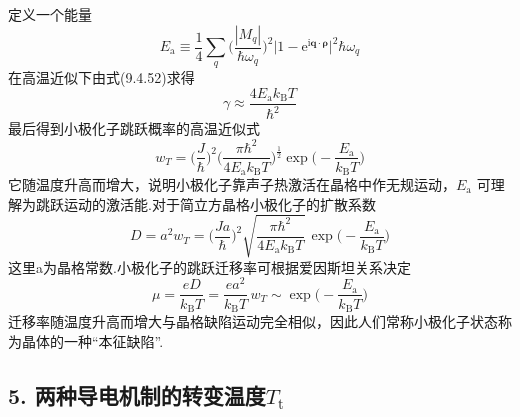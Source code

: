 定义一个能量
\begin{equation}
  E_{\mathrm a}\equiv\frac{1}{4}\sum_{q}
  \biggl(\frac{|M_{q}|}{\hbar\omega_{q}}\biggr)^{2}
  \bigl|1-\mathrm{e}^{\mathrm{i}\boldsymbol{q}\cdot\boldsymbol{\rho}}\bigr|^{2}
  \hbar\omega_{q}
\end{equation}
在高温近似下由式(9.4.52)求得
\begin{equation}
  \gamma\approx\frac{4E_{\mathrm a}k_{\mathrm B}T}{\hbar^{2}}
\end{equation}
最后得到小极化子跳跃概率的高温近似式
\begin{equation}
  w_{T}=\biggl(\frac{J}{\hbar}\biggr)^{2}
  \biggl(\frac{\pi\hbar^{2}}{4E_{\mathrm a}k_{\mathrm B}T}\biggr)^{\frac{1}{2}}
  \exp\biggl(-\frac{E_{\mathrm a}}{k_{\mathrm B}T}\biggr)
\end{equation}
它随温度升高而增大，说明小极化子靠声子热激活在晶格中作无规运动，$E_{\mathrm a}$ 可理解为跳跃运动的激活能.对于简立方晶格小极化子的扩散系数
\begin{equation}
  D=a^{2}w_{T}=\biggl(\frac{Ja}{\hbar}\biggr)^{2}
  \sqrt{\frac{\pi\hbar^{2}}{4E_{\mathrm a}k_{\mathrm B}T}}\,
  \exp\biggl(-\frac{E_{\mathrm a}}{k_{\mathrm B}T}\biggr)
\end{equation}
这里a为晶格常数.小极化子的跳跃迁移率可根据爱因斯坦关系决定
\begin{equation}
  \mu=\frac{eD}{k_{\mathrm B}T}
  =\frac{ea^{2}}{k_{\mathrm B}T}\,w_{T}
  \sim\exp\biggl(-\frac{E_{\mathrm a}}{k_{\mathrm B}T}\biggr)
\end{equation}
迁移率随温度升高而增大与晶格缺陷运动完全相似，因此人们常称小极化子状态称为晶体的一种“本征缺陷”.

\subsection*{5. 两种导电机制的转变温度$T_{\mathrm t}$}

